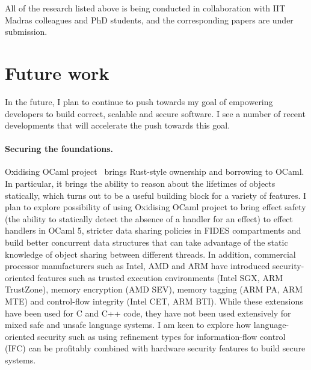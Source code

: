 \documentclass[screen,acmsmall,nonacm]{acmart}
\begin{document}
All of the research listed above is being conducted in collaboration with IIT
Madras colleagues and PhD students, and the corresponding papers are under
submission.

\section{Future work}

In the future, I plan to continue to push towards my goal of empowering
developers to build correct, scalable and secure software. I see a number of
recent developments that will accelerate the push towards this goal.

\paragraph{\bf Securing the foundations.} Oxidising OCaml
project~\cite{oxidising} brings Rust-style ownership and borrowing to OCaml. In
particular, it brings the ability to reason about the lifetimes of objects
statically, which turns out to be a useful building block for a variety of
features. I plan to explore possibility of using Oxidising OCaml project to
bring effect safety (the ability to statically detect the absence of a handler
for an effect) to effect handlers in OCaml 5, stricter data sharing policies in
FIDES compartments and build better concurrent data structures that can take
advantage of the static knowledge of object sharing between different threads.
In addition, commercial processor manufacturers such as Intel, AMD and ARM have
introduced security-oriented features such as trusted execution environments
(Intel SGX, ARM TrustZone), memory encryption (AMD SEV), memory tagging (ARM
PA, ARM MTE) and control-flow integrity (Intel CET, ARM BTI). While these
extensions have been used for C and C++ code, they have not been used
extensively for mixed safe and unsafe language systems. I am keen to explore
how language-oriented security such as using refinement types for
information-flow control (IFC) can be profitably combined with hardware
security features to build secure systems.
\end{document}
